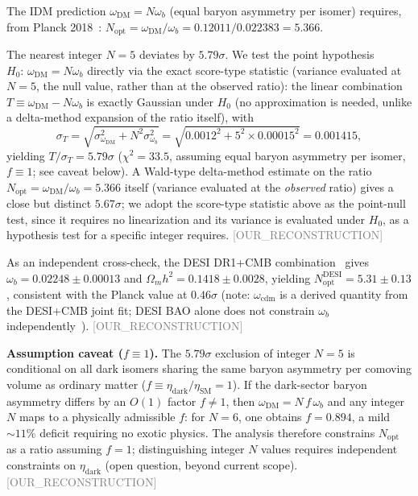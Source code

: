 \documentclass[twocolumn,prd,amsmath,amssymb,floatfix]{revtex4-2}
\newcommand{\reconstruction}{\textcolor{gray}{\small[OUR\_RECONSTRUCTION]}}
\begin{document}
The IDM prediction $\omega_\mathrm{DM} = N \omega_b$ (equal baryon asymmetry per
isomer) requires, from Planck 2018~\cite{planck2018}: $N_\mathrm{opt} =
\omega_\mathrm{DM}/\omega_b = 0.12011/0.022383 = 5.366$.

The nearest integer $N=5$ deviates by $5.79\sigma$. We test the point
hypothesis $H_0\!:\,\omega_\mathrm{DM} = N\omega_b$ directly via the exact
score-type statistic (variance evaluated at $N=5$, the null value, rather
than at the observed ratio): the linear combination
$T \equiv \omega_\mathrm{DM} - N\omega_b$ is exactly Gaussian under $H_0$
(no approximation is needed, unlike a delta-method expansion of the ratio
itself), with
\begin{equation}
\sigma_T = \sqrt{\sigma_{\omega_\mathrm{DM}}^2 + N^2\sigma_{\omega_b}^2}
= \sqrt{0.0012^2 + 5^2\times 0.00015^2} = 0.001415,
\end{equation}
yielding $T/\sigma_T = 5.79\sigma$ ($\chi^2 = 33.5$,
assuming equal baryon asymmetry per isomer, $f \equiv 1$;
see caveat below). A Wald-type delta-method estimate on the ratio
$N_\mathrm{opt} = \omega_\mathrm{DM}/\omega_b = 5.366$ itself (variance
evaluated at the \emph{observed} ratio) gives a close but distinct
$5.67\sigma$; we adopt the score-type statistic above as the point-null
test, since it requires no linearization and its variance is evaluated
under $H_0$, as a hypothesis test for a specific integer requires.
\reconstruction

As an independent cross-check, the DESI DR1+CMB combination~\cite{desi2024vi}
gives $\omega_b = 0.02248 \pm 0.00013$ and $\Omega_m h^2 = 0.1418 \pm 0.0028$,
yielding $N_\mathrm{opt}^\mathrm{DESI} = 5.31 \pm 0.13$,
consistent with the Planck value at $0.46\sigma$ (note: $\omega_\mathrm{cdm}$ is
a derived quantity from the DESI+CMB joint fit; DESI BAO alone does not constrain
$\omega_b$ independently~\cite{desi2024vi}).
\reconstruction

\textbf{Assumption caveat ($f \equiv 1$).}
The $5.79\sigma$ exclusion of integer $N=5$ is conditional on all dark isomers
sharing the same baryon asymmetry per comoving volume as ordinary matter
($f \equiv \eta_\mathrm{dark}/\eta_\mathrm{SM} = 1$).
If the dark-sector baryon asymmetry differs by an $O(1)$ factor $f \neq 1$,
then $\omega_\mathrm{DM} = N\,f\,\omega_b$ and any integer $N$ maps to
a physically admissible $f$: for $N=6$, one obtains $f = 0.894$, a mild
$\sim\!11\%$ deficit requiring no exotic physics.
The analysis therefore constrains $N_\mathrm{opt}$ as a ratio assuming $f=1$;
distinguishing integer $N$ values requires independent constraints on
$\eta_\mathrm{dark}$ (open question, beyond current scope).
\reconstruction
\end{document}
